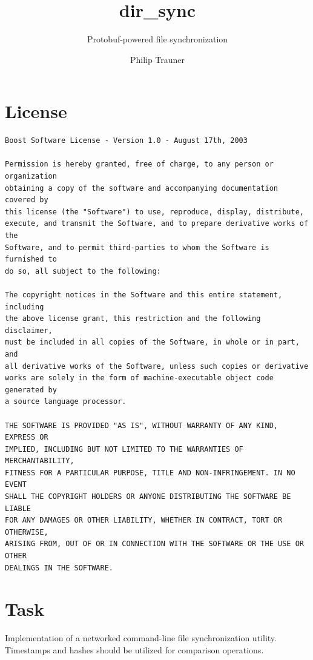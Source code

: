 \documentclass[a4paper]{article}
\title{dir\_sync}
\subtitle{Protobuf-powered file synchronization}
\author{Philip Trauner}
\date{ }
\begin{document}
 
\begin{titlepage}
\maketitle
\end{titlepage}

\tableofcontents
\thispagestyle{empty}
\newpage

\section{License}
\begin{verbatim}
Boost Software License - Version 1.0 - August 17th, 2003

Permission is hereby granted, free of charge, to any person or organization
obtaining a copy of the software and accompanying documentation covered by
this license (the "Software") to use, reproduce, display, distribute,
execute, and transmit the Software, and to prepare derivative works of the
Software, and to permit third-parties to whom the Software is furnished to
do so, all subject to the following:

The copyright notices in the Software and this entire statement, including
the above license grant, this restriction and the following disclaimer,
must be included in all copies of the Software, in whole or in part, and
all derivative works of the Software, unless such copies or derivative
works are solely in the form of machine-executable object code generated by
a source language processor.

THE SOFTWARE IS PROVIDED "AS IS", WITHOUT WARRANTY OF ANY KIND, EXPRESS OR
IMPLIED, INCLUDING BUT NOT LIMITED TO THE WARRANTIES OF MERCHANTABILITY,
FITNESS FOR A PARTICULAR PURPOSE, TITLE AND NON-INFRINGEMENT. IN NO EVENT
SHALL THE COPYRIGHT HOLDERS OR ANYONE DISTRIBUTING THE SOFTWARE BE LIABLE
FOR ANY DAMAGES OR OTHER LIABILITY, WHETHER IN CONTRACT, TORT OR OTHERWISE,
ARISING FROM, OUT OF OR IN CONNECTION WITH THE SOFTWARE OR THE USE OR OTHER
DEALINGS IN THE SOFTWARE.
\end{verbatim}

\newpage

\section{Task}
Implementation of a networked command-line file synchronization utility. Timestamps and hashes should be utilized for comparison operations.
\end{document}
